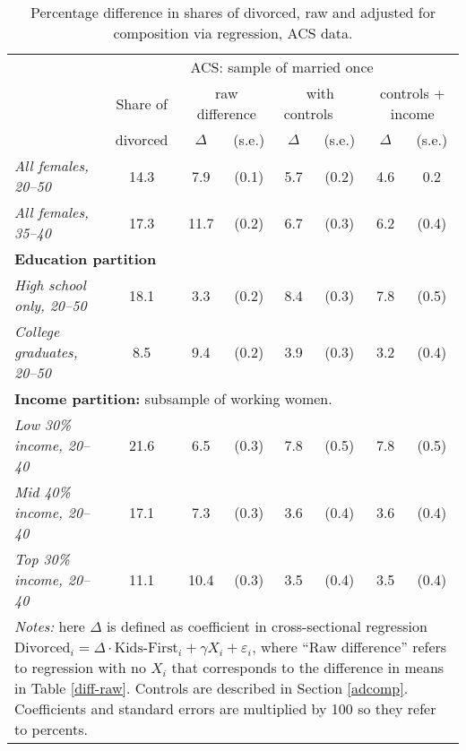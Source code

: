 \documentclass[12pt,letter]{article}
\begin{document}
\begin{table}
\begin{center}
\begin{tabular}{l c  c c c c c c}\cline{2-8}
\multicolumn{1}{c}{} & \multicolumn{7}{c}{ACS: sample of married once}\\\cline{2-8}
\multicolumn{1}{c}{} & \small Share of &\multicolumn{2}{c}{\small raw difference} & \multicolumn{2}{c}{\small with controls \,\,\, \,\,\,} & \multicolumn{2}{c}{\small controls + income} \\ \cline{3-8}
\multicolumn{1}{c}{} & \small divorced & $\Delta$ & (s.e.) & $\Delta$ & (s.e.) & $\Delta$ & (s.e.) \\\hline\hline
\textit{All females, 20--50} & 14.3 &  \phantom{0}7.9 &   (0.1) &    5.7  &    (0.2) &     4.6   &   0.2 \\
\textit{All females, 35--40} &  17.3 &  11.7  &  (0.2) &   6.7 &  (0.3) &     6.2  &   (0.4) \\\hline\hline
\multicolumn{8}{p{0.6\linewidth}}{\textbf{Education partition}}\\\hline
\textit{High school only, 20--50} & 18.1 &   \phantom{0}3.3  &    (0.2) &   8.4 &   (0.3)   &  7.8   &  (0.5) \\
\textit{College graduates, 20--50} & \phantom{0}8.5 &   \phantom{0}9.4 &   (0.2) &   3.9 &   (0.3) &   3.2   &  (0.4) \\\hline\hline
\multicolumn{8}{p{0.6\linewidth}}{\textbf{Income partition:} subsample of working women.}\\\hline
\textit{Low 30\% income, 20--40} &  21.6 &  \phantom{0}6.5 &    (0.3) &    7.8 &  (0.5) &   7.8   &  (0.5) \\
\textit{Mid 40\% income, 20--40} &  17.1 &  \phantom{0}7.3 &   (0.3) &    3.6   & (0.4) &   3.6 &    (0.4) \\
\textit{Top 30\% income, 20--40} & 11.1 &  10.4 &  (0.3) &    3.5 &   (0.4) & 3.5 &  (0.4) \\
\hline
\multicolumn{8}{p{0.9\linewidth}}{ \footnotesize \textit{Notes:} here $\Delta$ is defined as coefficient in cross-sectional regression
$\text{Divorced}_i = \Delta \cdot \text{Kids-First}_i + \gamma X_i + \varepsilon_i$,
where ``Raw difference'' refers to regression with no $X_i$ that corresponds to the difference in means in Table \ref{diff-raw}. Controls are described in Section \ref{adcomp}. Coefficients and standard errors are multiplied by 100 so they refer to percents.}\\\hline
\end{tabular}
\caption{Percentage difference in shares of divorced, raw and adjusted for composition via regression, ACS data.\label{diff-contr}}
\end{center}
\end{table}
\end{document}
